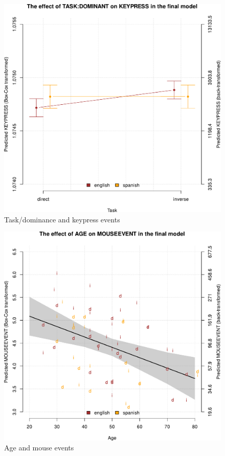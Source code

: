 \documentclass[output=paper]{langscibook}
\begin{document}
\begin{figure}
        \includegraphics[height=.45\textheight]{figures/Ferreira-Figure1.5.pdf}
        \caption{Task/dominance and keypress events\label{fig5h}}
\end{figure}

\begin{figure}
        \includegraphics[height=.45\textheight]{figures/Ferreira-Figure1.6.pdf}
        \caption{Age and mouse events\label{fig6h}}
\end{figure}
\end{document}
